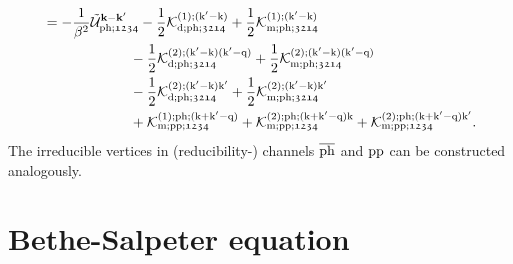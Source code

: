 \documentclass[../../main.tex]{subfiles}
\begin{document}
\begin{subequations}
\begin{align}
\begin{split}
	&=-\frac{1}{\beta^2}\tilde{\mathcal{U}}^{\textbf{k}-\textbf{k}'}_{\text{ph};\mathfrak{1234}}-\frac12\mathcal{K}^{(1);(\text{k}'-\text{k})}_{\text{d};\text{ph};\mathfrak{3214}}+\frac12\mathcal{K}^{(1);(\text{k}'-\text{k})}_{\text{m};\text{ph};\mathfrak{3214}}\\
	&\qquad\qquad\qquad\:-\frac12\mathcal{K}^{(2);(\text{k}'-\text{k})(\text{k}'-\text{q})}_{\text{d};\text{ph};\mathfrak{3214}}+\frac12\mathcal{K}^{(2);(\text{k}'-\text{k})(\text{k}'-\text{q})}_{\text{m};\text{ph};\mathfrak{3214}}\\
	&\qquad\qquad\qquad\:-\frac12\mathcal{K}^{(2);(\text{k}'-\text{k})\text{k}'}_{\text{d};\text{ph};\mathfrak{3214}}+\frac12\mathcal{K}^{(2);(\text{k}'-\text{k})\text{k}'}_{\text{m};\text{ph};\mathfrak{3214}}\\
	&\qquad\qquad\qquad\:+\mathcal{K}^{(1);\text{ph};(\text{k}+\text{k}'-\text{q})}_{\text{m};\text{pp};\mathfrak{1234}} + \mathcal{K}^{(2);\text{ph};(\text{k}+\text{k}'-\text{q})\text{k}}_{\text{m};\text{pp};\mathfrak{1234}}+\mathcal{K}^{(2);\text{ph};(\text{k}+\text{k}'-\text{q})\text{k}'}_{\text{m};\text{pp};\mathfrak{1234}}.
\end{split}
\end{align}
\end{subequations}
The irreducible vertices in (reducibility-) channels $\overline{\text{ph}}$ and $\text{pp}$ can be constructed analogously.

\section{Bethe-Salpeter equation}\label{sec:bethe_salpeter}
\end{document}

